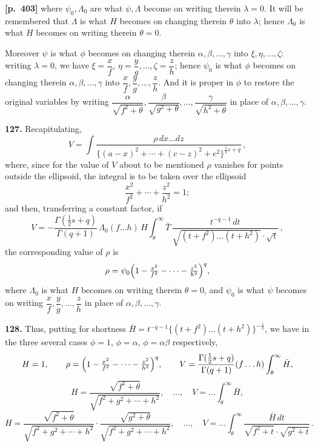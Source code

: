 \documentclass[11pt,a4paper]{article}
\begin{document}
\noindent\textbf{[p.~403]}\quad
where $\psi_{0}, \Lambda_{0}$ are what $\psi, \Lambda$ become on writing therein $\lambda = 0$. It will be remembered that $\Lambda$ is what $H$ becomes on changing therein $\theta$ into $\lambda$; hence $\Lambda_{0}$ is what $H$ becomes on writing therein $\theta = 0$.

Moreover $\psi$ is what $\phi$ becomes on changing therein $\alpha, \beta, \ldots, \gamma$ into $\xi, \eta, \ldots, \zeta$: writing $\lambda = 0$, we have $\xi = \dfrac{x}{f}$, $\eta = \dfrac{y}{g}, \ldots, \zeta = \dfrac{z}{h}$; hence $\psi_{0}$ is what $\phi$ becomes on changing therein $\alpha, \beta, \ldots, \gamma$ into $\dfrac{x}{f}, \dfrac{y}{g}, \ldots, \dfrac{z}{h}$. And it is proper in $\phi$ to restore the original variables by writing $\dfrac{\alpha}{\sqrt{f^{2}+\theta}}, \dfrac{\beta}{\sqrt{g^{2}+\theta}}, \ldots, \dfrac{\gamma}{\sqrt{h^{2}+\theta}}$ in place of $\alpha, \beta, \ldots, \gamma$.

\textbf{127.} Recapitulating,
\[
V = \int \frac{\rho\,dx\ldots dz}{\bigl\{(a-x)^{2} + \cdots + (c-z)^{2} + e^{2}\bigr\}^{\tfrac{1}{2}s + q}}\,,
\]
where, since for the value of $V$ about to be mentioned $\rho$ vanishes for points outside the ellipsoid, the integral is to be taken over the ellipsoid
\[
\frac{x^{2}}{f^{2}} + \cdots + \frac{z^{2}}{h^{2}} = 1;
\]
and then, transferring a constant factor, if
\[
V = -\frac{\Gamma(\tfrac{1}{2}s + q)}{\Gamma(q+1)}\,\Lambda_{0}(f\ldots h)\,H\int_{\theta}^{\infty}\bar{T}\,\frac{t^{-q-1}\,dt}{\sqrt{(t+f^{2})\ldots(t+h^{2})}\cdot\sqrt{t}}\,,
\]
the corresponding value of $\rho$ is
\[
\rho = \psi_{0}\Bigl(1 - \tfrac{x^{2}}{f^{2}} - \cdots - \tfrac{z^{2}}{h^{2}}\Bigr)^{q},
\]
where $\Lambda_{0}$ is what $H$ becomes on writing therein $\theta = 0$, and $\psi_{0}$ is what $\psi$ becomes on writing $\dfrac{x}{f}, \dfrac{y}{g}, \ldots, \dfrac{z}{h}$ in place of $\alpha, \beta, \ldots, \gamma$.

\textbf{128.} Thus, putting for shortness $\bar{H} = t^{-q-1}\bigl\{(t+f^{2})\ldots(t+h^{2})\bigr\}^{-\tfrac{1}{2}}$, we have in the three several cases $\phi = 1$, $\phi = \alpha$, $\phi = \alpha\beta$ respectively,
\[
H = 1,\qquad \rho = \Bigl(1 - \tfrac{x^{2}}{f^{2}} - \cdots - \tfrac{z^{2}}{h^{2}}\Bigr)^{q},\qquad V = \frac{\Gamma(\tfrac{1}{2}s + q)}{\Gamma(q+1)}(f\ldots h)\int_{\theta}^{\infty}\bar{H},
\]
\[
H = \frac{\sqrt{f^{2}+\theta}}{\sqrt{f^{2}+g^{2}+\cdots+h^{2}}},\quad\ldots,\quad V = \ldots\int_{\theta}^{\infty}\bar{H},
\]
\[
H = \frac{\sqrt{f^{2}+\theta}}{\sqrt{f^{2}+g^{2}+\cdots+h^{2}}}\cdot\frac{\sqrt{g^{2}+\theta}}{\sqrt{f^{2}+g^{2}+\cdots+h^{2}}},\quad\ldots,\quad V = \ldots\int_{\theta}^{\infty}\frac{\bar{H}\,dt}{\sqrt{f^{2}+t}\cdot\sqrt{g^{2}+t}}\,.
\]
\end{document}
